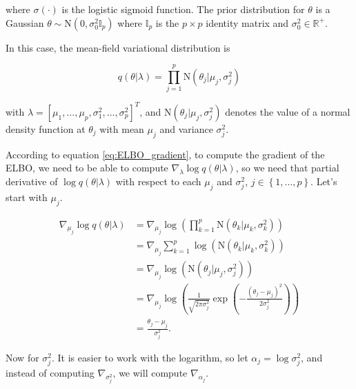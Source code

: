 where $\sigma(\cdot)$ is the logistic sigmoid function. The prior distribution for $\theta$ is a Gaussian $\theta \sim \mathrm{N}(0, \sigma_0^2 \mathbb{I}_p)$ where $\mathbb{I}_p$ is the $p \times p$ identity matrix and $\sigma_0^2 \in \mathbb{R}^+$.

In this case, the mean-field variational distribution is

\begin{equation}
  \label{eq:mean_field_normal_prior}
  q(\theta | \lambda) = \prod_{j = 1}^p \mathrm{N}(\theta_j | \mu_j, \sigma_j^2)
 \end{equation}

with $\lambda = \left[ \mu_1, \hdots, \mu_p, \sigma_1^2, \hdots, \sigma_p^2 \right]^T$, and $\mathrm{N}(\theta_j | \mu_j, \sigma_j^2)$ denotes the value of a normal density function at $\theta_j$ with mean $\mu_j$ and variance $\sigma_j^2$.

According to equation \ref{eq:ELBO_gradient}, to compute the gradient of the ELBO, we need to be able to compute $\nabla_{\lambda} \log q(\theta | \lambda)$, so we need that partial derivative of $\log q(\theta | \lambda)$ with respect to each $\mu_j$ and $\sigma_j^2$, $j \in \left\{ 1, \hdots, p \right\}$. Let's start with $\mu_j$.

\begin{equation*}
  \begin{split}
      \nabla_{\mu_j} \log q(\theta | \lambda) & =
      \nabla_{\mu_j} \log \left( \prod_{ k = 1}^p \mathrm{N} \left( \theta_k | \mu_k, \sigma_k^2 \right) \right) \\
      &= \nabla_{\mu_j} \sum_{ k = 1}^p \log \left( \mathrm{N} \left( \theta_k | \mu_k, \sigma_k^2 \right) \right) \\
      &= \nabla_{\mu_j} \log \left( \mathrm{N} \left( \theta_j | \mu_j, \sigma_j^2 \right) \right) \\
      &= \nabla_{\mu_j} \log \left( \frac{1}{\sqrt{2 \pi \sigma_j^2}} \exp \left( -\frac{(\theta_j - \mu_j)^2}{2 \sigma_j^2} \right) \right) \\
      &= \frac{\theta_j - \mu_j}{\sigma_j^2}.
  \end{split}
\end{equation*}

Now for $\sigma_j^2$. It is easier to work with the logarithm, so let $\alpha_j = \log \sigma_j^2$, and instead of computing $\nabla_{\sigma_j^2}$, we will compute $\nabla_{\alpha_j}$.

